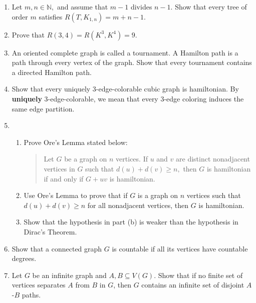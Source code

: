 \documentclass[12pt]{article}
\renewcommand{\emph}[1]{\textsf{\textbf{#1}}}
\begin{document}
\begin{enumerate}
	\item Let $m,n \in \mathbb{N},$ and assume that $m-1$ divides $n-1.$ Show that every tree of order $m$ satisfies $R(T,K_{1,n})=m+n-1.$
	\item Prove that $R(3,4)=R(K^3,K^4)=9.$ 
	\item An oriented complete graph is called a tournament. A Hamilton path is a path through every vertex of the graph. Show that every tournament contains a directed Hamilton path. 
	\item Show that every uniquely 3-edge-colorable cubic graph is hamiltonian. By \emph{uniquely} 3-edge-colorable, we mean that every 3-edge coloring induces the same edge partition.
	\item 
	\begin{enumerate}
	\item Prove Ore's Lemma stated below:
	\begin{quote} Let $G$ be a graph on $n$ vertices. If $u$ and $v$ are distinct nonadjacent vertices in $G$ such that $d(u)+d(v)\geq n,$ then $G$ is hamiltonian if and only if $G+uv$ is hamiltonian.\end{quote}
	\item Use Ore's Lemma to prove that if $G$ is a graph on $n$ vertices such that $d(u)+d(v) \geq n$ for all nonadjacent vertices, then $G$ is hamiltonian.
	\item Show that the hypothesis in part (b) is weaker than the hypothesis in Dirac's Theorem.
	\end{enumerate}
	\item Show that a connected graph $G$ is countable if all its vertices have countable degrees.
	\item Let $G$ be an infinite graph and $A,B \subseteq V(G).$ Show that if no finite set of vertices separates $A$ from $B$ in $G$, then $G$ contains an infinite set of disjoint $A$-$B$ paths.
\end{enumerate}
\end{document}
